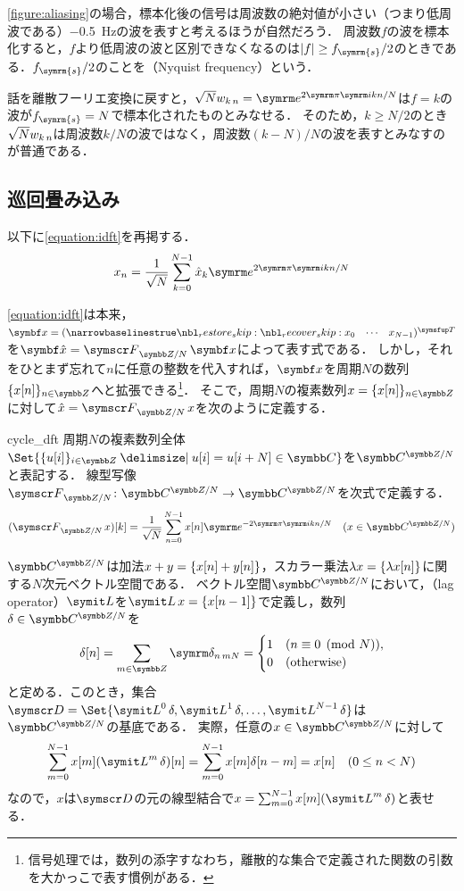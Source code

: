 \documentclass[../../main]{subfiles}
\begin{document}
\cref{figure:aliasing}の場合，標本化後の信号は周波数の絶対値が小さい（つまり低周波である）\SI{-0.5}{Hz}の波を表すと考えるほうが自然だろう．
周波数\(f\)の波を標本化すると，\(f\)より低周波の波と区別できなくなるのは\(\abs{f}\geq f_{\symrm{s}}/2\)のときである．\(f_{\symrm{s}}/2\)のことを（Nyquist frequency）という．

話を離散フーリエ変換に戻すと，\(\sqrt{N}\midx{w}{k}{n}=\napr^{2\krez\iuni kn/N}\)は\(f=k\)の波が\(f_{\symrm{s}}=N\)で標本化されたものとみなせる．
そのため，\(k\geq N/2\)のとき\(\sqrt{N}w_{k\,n}\)は周波数\(k/N\)の波ではなく，周波数\((k-N)/N\)の波を表すとみなすのが普通である．

\subsection{巡回畳み込み}

以下に\cref{equation:idft}を再掲する．
\[
  x_n = \frac{1}{\sqrt{N}}\sum_{k=0}^{N-1}\hat{x}_k\napr^{2\krez\iuni kn/N}
\]

\cref{equation:idft}は本来，\(\vect{x}=\trps{\rowvect{x_0 & \cdots & x_{N-1}}}\)を\(\vect{\hat{x}}=\dft{N}\vect{x}\)によって表す式である．
しかし，それをひとまず忘れて\(n\)に任意の整数を代入すれば，\(\vect{x}\)を周期\(N\)の数列\(\seq{x[n]}_{n\in\numset{Z}}\)へと拡張できる\footnote{信号処理では，数列の添字\texttwoemdash すなわち，離散的な集合で定義された関数の引数\texttwoemdash を大かっこで表す慣例がある．}．
そこで，周期\(N\)の複素数列\(x=\seq{x[n]}_{n\in\numset{Z}}\)に対して\(\hat{x}=\dft{N}x\)を次のように定義する．

\begin{definition}{}{cycle_dft}
  周期\(N\)の複素数列全体\(\Set{\seq{u[i]}_{i\in\numset{Z}}\given u[i]=u[i+N]\in\numset{C}}\)を\(\cycles{\numset{C}}{N}\)と表記する．
  線型写像\(\dft{N}\colon\cycles{\numset{C}}{N}\to\cycles{\numset{C}}{N}\)を次式で定義する．
  \[
    (\dft{N}x)[k] =  \frac{1}{\sqrt{N}}\sum_{n=0}^{N-1}x[n]\napr^{-2\krez\iuni kn/N}\quad(x\in\cycles{\numset{C}}{N})
  \]
\end{definition}

\(\cycles{\numset{C}}{N}\)は加法\(x+y=\lbrace x[n]+y[n]\rbrace\)，スカラー乗法\(\lambda x=\lbrace\lambda x[n]\rbrace\)に関する\(N\)次元ベクトル空間である．
ベクトル空間\(\cycles{\numset{C}}{N}\)において，（lag operator）\(\lagop\)を\(\lagop x=\seq{x[n-1]}\)で定義し，数列\(\delta\in\cycles{\numset{C}}{N}\)を
\[
  \delta[n] = \sum_{m\in\numset{Z}}\kdelta{n}{mN}
  = \begin{cases}1 & (n\equiv 0\pmod{N}),\\ 0 & \text{(otherwise)}\end{cases}
\]
と定める．このとき，集合\(\basis{D}=\Set{\lagop^0\delta,\lagop^1\delta,\dots,\lagop^{N-1}\delta}\)は\(\cycles{\numset{C}}{N}\)の基底である．
実際，任意の\(x\in\cycles{\numset{C}}{N}\)に対して
\[
  \sum_{m=0}^{N-1}x[m](\lagop^m\delta)[n] = \sum_{m=0}^{N-1}x[m]\delta[n-m]
  = x[n]\quad(0\leq n<N)
\]
なので，\(x\)は\(\basis{D}\)の元の線型結合で\(x=\sum_{m=0}^{N-1}x[m](\lagop^m\delta)\)と表せる．
\end{document}
